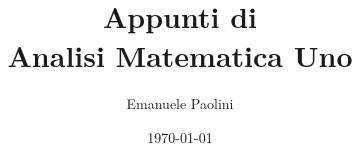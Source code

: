 \documentclass{book}
\newcommand{\publishers}[1]{}
\newcommand{\doclicenseThis}{}
\newcommand{\printindex}{}
\begin{document}
\title{Appunti di\\Analisi Matematica Uno}
\author{Emanuele Paolini}
\date{\today}
\publishers{manu-fatto}

\frontmatter %

\maketitle

\thispagestyle{empty}
\mbox{}
\vfill
\doclicenseThis



\tableofcontents

\mainmatter 

% 
% 
% 
%
% 
% 
% 
% 
% 

\appendix

% 

\backmatter

\nocite{Giusti}
\nocite{Courant}
\nocite{Marcellini}
\nocite{Rudin}
\nocite{PaganiSalsa}
\nocite{appunti_logica}


{}


\printindex
\end{document}
